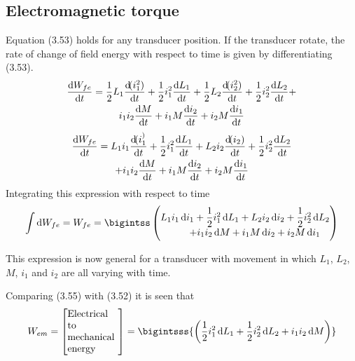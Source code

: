 \documentclass[a4paper,numbers=noenddot,12pt]{scrbook}
\begin{document}
            \subsection{Electromagnetic torque}
            Equation (3.53) holds for any transducer position. If the transducer rotate, the rate of change of field energy with respect to time is given by differentiating (3.53).
            \begin{multline*}
                \dfrac{\dif W_{fe}}{\dif t} = 
                \dfrac{1}{2} L_1 \dfrac{\dif (i_1^2)}{\dif t} + 
                \dfrac{1}{2} i_1^2 \dfrac{\dif L_1}{\dif t} +
                \dfrac{1}{2} L_2 \dfrac{\dif (i_2^2)}{\dif t} +
                \dfrac{1}{2} i_2^2 \dfrac{\dif L_2}{\dif t} + \\
                i_1 i_2 \dfrac{\dif M}{\dif t} +
                i_1 M \dfrac{\dif i_2}{\dif t} +
                i_2 M \dfrac{\dif i_1}{\dif t} 
            \end{multline*}
            \begin{multline}
                \dfrac{\dif W_{fe}}{\dif t} = 
                L_1 i_1 \dfrac{\dif (i_1^)}{\dif t} + 
                \dfrac{1}{2} i_1^2 \dfrac{\dif L_1}{\dif t} +
                L_2 i_2 \dfrac{\dif (i_2)}{\dif t} +
                \dfrac{1}{2} i_2^2 \dfrac{\dif L_2}{\dif t} \\
                + i_1 i_2 \dfrac{\dif M}{\dif t} +
                i_1 M \dfrac{\dif i_2}{\dif t} +
                i_2 M \dfrac{\dif i_1}{\dif t}
                \label{eq:Eq3.54}
            \end{multline}
            Integrating this expression with respect to time
            \begin{equation}
                \int \dif W_{fe} = W_{fe} = \bigintss
                \begin{pmatrix}
                    L_1 i_1 \dif i_1 + \dfrac{1}{2} i_1^2 \dif L_1 + L_2 i_2 \dif i_2 + \dfrac{1}{2} i_2^2 \dif L_2 \\
                    \qquad + i_1 i_2 \dif M + i_1 M \dif i_2 + i_2 M \dif i_1
                \end{pmatrix}
                \label{eq:Eq3.55}
            \end{equation}

            This expression is now general for a transducer with movement in which $L_1$, $L_2$, $M$, $i_1$ and $i_2$ are all varying with time.

            Comparing (3.55) with (3.52) it is seen that
            \begin{equation}
                W_{em} = \left[\parbox{12ex}{Electrical to\\mechanical\\energy} \right] = \bigintsss{\left( \dfrac{1}{2} i_1^2 \dif L_1 + \dfrac{1}{2} i_2^2 \dif L_2 + i_1 i_2 \dif M \right)}
                \label{eq:Eq3.56}
            \end{equation}
\end{document}
